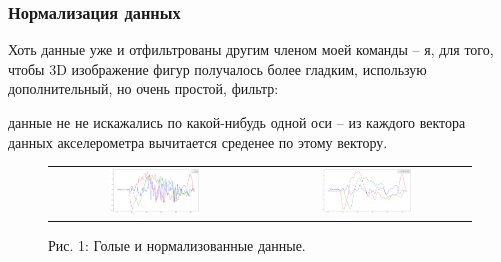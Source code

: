 \subsubsection{Нормализация данных}
Хоть данные уже и отфильтрованы другим членом моей команды – я, для того, чтобы 3D изображение фигур получалось более гладким, использую дополнительный, но очень простой, фильтр:

\begin{figure}[H]
\end{figure}

данные не не искажались по какой-нибудь одной оси – из каждого вектора данных акселерометра вычитается среденее по этому вектору.

\begin{figure}[H]
    \begin{center}
        \begin{tabular}{cc}
            \includegraphics[width=0.45\textwidth]{sam_images/graph_1.png} & 
            \includegraphics[width=0.45\textwidth]{sam_images/graph_2.png} \\
        \end{tabular}
    \end{center}
    \caption{Рис. 1: Голые и нормализованные данные.}
\end{figure}


